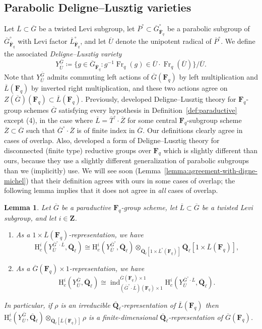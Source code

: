 \documentclass[reqno]{amsart}
\numberwithin{equation}{subsection}
\newcommand{\F}{\mathbf{F}}
\newcommand{\Q}{\mathbf{Q}}
\newcommand{\Z}{\mathbf{Z}}
\newcommand{\ol}[1]{\overline{#1}}
\newcommand{\co}{\colon}
\DeclareMathOperator{\ind}{ind}
\DeclareMathOperator{\Fr}{Fr}
\newcommand{\rH}{\ensuremath{\mathrm{H}}\xspace}
\newtheorem{lemma}[thm]{Lemma}
\theoremstyle{remark}
\numberwithin{equation}{subsection}
\numberwithin{figure}{subsection}
\begin{document}
\subsection{Parabolic Deligne--Lusztig varieties}\label{ss:ns-dl-reps} 
Let $\ol L \subset \ol G$ be a twisted Levi subgroup, let $\ol P^\circ \subset \ol G^\circ_{\ol\F_q}$ be a parabolic subgroup of $\ol G^\circ_{\ol\F_q}$ with Levi factor $\ol L^\circ_{\ol\F_q}$, and let $\ol U$ denote the unipotent radical of $\ol P^\circ$. We define the associated \emph{Deligne--Lusztig variety}
\[
Y_{\ol U}^{\ol G} \coloneqq \{g \in \ol G_{\ol\F_q}\co g^{-1}\Fr_q(g) \in \ol U \cdot \Fr_q(\ol U)\}/\ol U.
\]
Note that $Y_{\ol U}^{\ol G}$ admits commuting left actions of $\ol G(\F_q)$ by left multiplication and $\ol L(\F_q)$ by inverted right multiplication, and these two actions agree on $Z(\ol G)(\F_q) \subset \ol L(\F_q)$. Previously, \cite{Kal21b} developed Deligne--Lusztig theory for $\F_q$-group schemes $\ol G$ satisfying every hypothesis in Definition~\ref{def:paraductive} except (4), in the case where $\ol L = \ol T^\circ \cdot \ol Z$ for some central $\F_q$-subgroup scheme $\ol Z \subset \ol G$ such that $\ol G^\circ \cdot \ol Z$ is of finite index in $\ol G$. Our definitions clearly agree in cases of overlap. Also, \cite{DM94} developed a form of Deligne--Lusztig theory for disconnected (finite type) reductive groups over $\F_q$ which is slightly different than ours, because they use a slightly different generalization of parabolic subgroups than we (implicitly) use. We will see soon (Lemma~\ref{lemma:agreement-with-digne-michel}) that their definition agrees with ours in some cases of overlap; the following lemma implies that it does not agree in \emph{all} cases of overlap.


\begin{lemma}\label{lemma:disc-dl-induction}
    Let $\ol G$ be a paraductive $\F_q$-group scheme, let $\ol L \subset \ol G$ be a twisted Levi subgroup, and let $i \in \Z$.
    \begin{enumerate}
        \item As a $1 \times \ol L(\F_q)$-representation, we have 
        \[
        \rH_c^i(Y_{\ol U}^{\ol G^\circ\cdot \ol L}, \ol\Q_\ell) \cong \rH_c^i(Y_{\ol U}^{\ol G^\circ}, \ol\Q_\ell) \otimes_{\ol\Q_\ell[1 \times \ol L^\circ(\F_q)]} \ol\Q_\ell[1 \times \ol L(\F_q)],
        \]
        \item As a $\ol G(\F_q) \times 1$-representation, we have 
        \[
        \rH_c^i(Y_{\ol U}^{\ol G}, \ol\Q_\ell) \cong \ind_{(\ol G^\circ \cdot \ol L)(\F_q) \times 1}^{\ol G(\F_q) \times 1} \rH_c^i(Y_{\ol U}^{\ol G^\circ \cdot \ol L}, \ol\Q_\ell).
        \]
    \end{enumerate}
    In particular, if $\rho$ is an irreducible $\ol\Q_\ell$-representation of $\ol L(\F_q)$ then $\rH_c^i(Y_{\ol U}^{\ol G}, \ol\Q_\ell) \otimes_{\ol\Q_\ell[\ol L(\F_q)]} \rho$ is a finite-dimensional $\ol\Q_\ell$-representation of $\ol G(\F_q)$.
\end{lemma}
\end{document}
